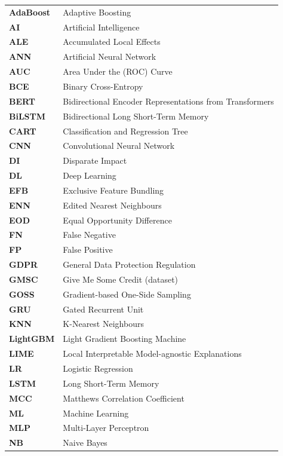 \documentclass[12pt,a4paper,final]{extreport}
\begin{document}
\begingroup
{}
\begin{longtable}{p{2.6cm}l}
\textbf{AdaBoost} & Adaptive Boosting \\
\textbf{AI} & Artificial Intelligence \\
\textbf{ALE} & Accumulated Local Effects \\
\textbf{ANN} & Artificial Neural Network \\
\textbf{AUC} & Area Under the (ROC) Curve \\
\textbf{BCE} & Binary Cross-Entropy \\
\textbf{BERT} & Bidirectional Encoder Representations from Transformers \\
\textbf{BiLSTM} & Bidirectional Long Short-Term Memory \\
\textbf{CART} & Classification and Regression Tree \\
\textbf{CNN} & Convolutional Neural Network \\
\textbf{DI} & Disparate Impact \\
\textbf{DL} & Deep Learning \\
\textbf{EFB} & Exclusive Feature Bundling \\
\textbf{ENN} & Edited Nearest Neighbours \\
\textbf{EOD} & Equal Opportunity Difference \\
\textbf{FN} & False Negative \\
\textbf{FP} & False Positive \\
\textbf{GDPR} & General Data Protection Regulation \\
\textbf{GMSC} & Give Me Some Credit (dataset) \\
\textbf{GOSS} & Gradient-based One-Side Sampling \\
\textbf{GRU} & Gated Recurrent Unit \\
\textbf{KNN} & K-Nearest Neighbours \\
\textbf{LightGBM} & Light Gradient Boosting Machine \\
\textbf{LIME} & Local Interpretable Model-agnostic Explanations \\
\textbf{LR} & Logistic Regression \\
\textbf{LSTM} & Long Short-Term Memory \\
\textbf{MCC} & Matthews Correlation Coefficient \\
\textbf{ML} & Machine Learning \\
\textbf{MLP} & Multi-Layer Perceptron \\
\textbf{NB} & Naive Bayes \\

\end{longtable}
\end{document}
